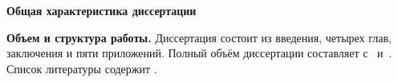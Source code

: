 \textbf{Общая характеристика диссертации} 
\newcommand{\aim}{\textbf{Целью}}
\newcommand{\scope}{\textbf{Область исследования}}
\newcommand{\subject}{\textbf{Предметом исследования}}
\newcommand{\tasks}{задачи}
\newcommand{\defpositions}{\textbf{Основные положения, выносимые на~защиту:}}
\newcommand{\novelty}{\textbf{Научная новизна:}}
\newcommand{\influence}{\textbf{Практическая значимость}}
\newcommand{\reliability}{\textbf{Степень достоверности}}
\newcommand{\probation}{\textbf{Апробация работы.}}
\newcommand{\contribution}{\textbf{Личный вклад.}}
\newcommand{\publications}{\textbf{Публикации.}}

\textbf{Объем и структура работы.} Диссертация состоит из введения, четырех глав, заключения и пяти приложений. Полный объём диссертации составляет  
с~
и~. Список литературы содержит  
.
\clearpage

